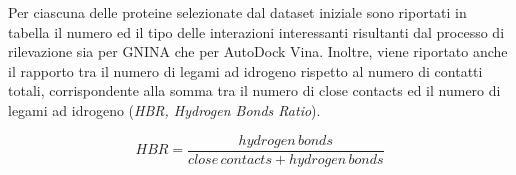Per ciascuna delle proteine selezionate dal dataset iniziale sono riportati in tabella il numero ed il tipo delle interazioni interessanti risultanti dal processo di rilevazione sia per GNINA che per AutoDock Vina. Inoltre, viene riportato anche il rapporto tra il numero di legami ad idrogeno rispetto al numero di contatti totali, corrispondente alla somma tra il numero di close contacts ed il numero di legami ad idrogeno (\textit{HBR, Hydrogen Bonds Ratio}).

\begin{equation} \label{eq:hbr}
    HBR = \frac{hydrogen\,bonds}{close\,contacts + hydrogen\,bonds}
\end{equation}

\begin{table}[H] 
\centering 
{}
\end{table}
